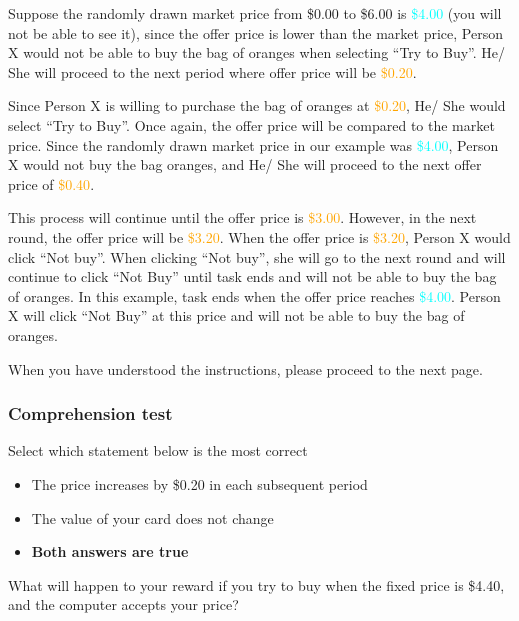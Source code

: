 \documentclass[12pt]{article}
\begin{document}
Suppose the randomly drawn market price from \$0.00 to \$6.00 is \textcolor{cyan}{\$4.00} (you will not be able to see it), since the offer price is lower than the market price, Person X would not be able to buy the bag of oranges when selecting “Try to Buy”. He/ She will proceed to the next period where offer price will be \textcolor{orange}{\$0.20}.

Since Person X is willing to purchase the bag of oranges at \textcolor{orange}{\$0.20}, He/ She would select “Try to Buy”. Once again, the offer price will be compared to the market price. Since the randomly drawn market price in our example was \textcolor{cyan}{\$4.00}, Person X would not buy the bag oranges, and He/ She will proceed to the next offer price of \textcolor{orange}{\$0.40}.


This process will continue until the offer price is \textcolor{orange}{\$3.00}.  However, in the next round, the offer price will be \textcolor{orange}{\$3.20}. When the offer price is \textcolor{orange}{\$3.20}, Person X would click “Not buy”. When clicking “Not buy”, she will go to the next round and will continue to click “Not Buy” until task ends and will not be able to buy the bag of oranges. In this example, task ends when the offer price reaches \textcolor{cyan}{\$4.00}. Person X will click “Not Buy” at this price and will not be able to buy the bag of oranges.
\vspace{0.5cm}

When you have understood the instructions, please proceed to the next page.
\clearpage

\subsubsection*{Comprehension test}

Select which statement below is the most correct

\begin{itemize}
    \item The price increases by \$0.20 in each subsequent period 
    \item The value of your card does not change
    \item \textbf{Both answers are true}
\end{itemize}

\vspace{0.5cm}

What will happen to your reward if you try to buy when the fixed price is \$4.40, and the computer accepts your price?
\end{document}
